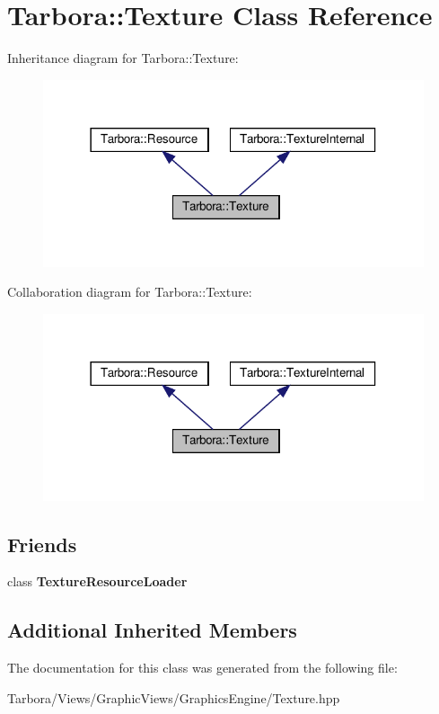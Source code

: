 \hypertarget{classTarbora_1_1Texture}{}\section{Tarbora\+:\+:Texture Class Reference}
\label{classTarbora_1_1Texture}


Inheritance diagram for Tarbora\+:\+:Texture\+:
\nopagebreak
\begin{figure}[H]
\begin{center}
\leavevmode
\includegraphics[width=318pt]{classTarbora_1_1Texture__inherit__graph}
\end{center}
\end{figure}


Collaboration diagram for Tarbora\+:\+:Texture\+:
\nopagebreak
\begin{figure}[H]
\begin{center}
\leavevmode
\includegraphics[width=318pt]{classTarbora_1_1Texture__coll__graph}
\end{center}
\end{figure}
\subsection*{Friends}
\begin{DoxyCompactItemize}
\item 
\mbox{\label{classTarbora_1_1Texture_a2894731fd152f0c4cbf3185a7212b8b7}} 
class {\bfseries Texture\+Resource\+Loader}
\end{DoxyCompactItemize}
\subsection*{Additional Inherited Members}


The documentation for this class was generated from the following file\+:\begin{DoxyCompactItemize}
\item 
Tarbora/\+Views/\+Graphic\+Views/\+Graphics\+Engine/Texture.\+hpp\end{DoxyCompactItemize}

